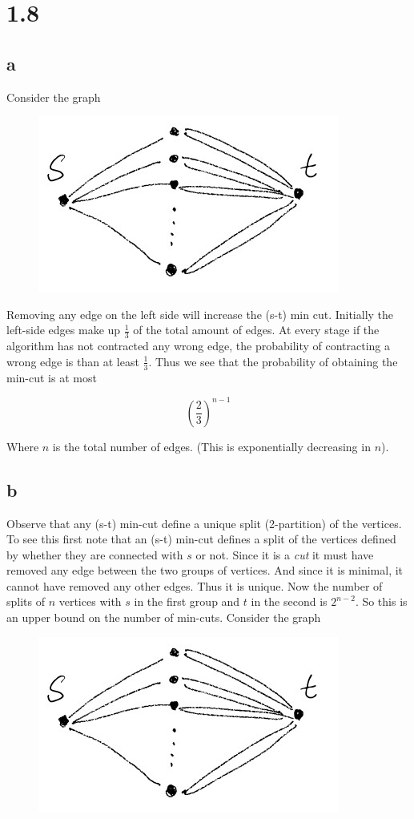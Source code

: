 


\section*{1.8}

\subsection*{a}

Consider the graph

\begin{figure}[h]
	\centering
	\includegraphics[width=0.4\linewidth]{figures/graph1.jpg}
\end{figure}

Removing any edge on the left side will increase the (s-t) min cut. 
Initially the left-side edges make up $\frac{1}{3}$ of the total amount of edges.
At every stage if the algorithm has not contracted any wrong edge, the probability of contracting a wrong edge is than at least $\frac{1}{3}$. Thus we see that the probability of obtaining the min-cut is at most

$$ \left(\frac{2}{3}\right)^{n-1} $$

Where $n$ is the total number of edges. (This is exponentially decreasing in $n$).

\subsection*{b}

Observe that any (s-t) min-cut define a unique split (2-partition) of the vertices.
To see this first note that an (s-t) min-cut defines a split of the vertices defined by whether they are connected with $s$ or not. 
Since it is a \emph{cut} it must have removed any edge between the two groups of vertices.
And since it is minimal, it cannot have removed any other edges. 
Thus it is unique.
Now the number of splits of $n$ vertices with $s$ in the first group and $t$ in the second is $2^{n-2}$.
So this is an upper bound on the number of min-cuts.
Consider the graph

\begin{figure}[h]
	\centering
	\includegraphics[width=0.4\linewidth]{figures/graph1.jpg}
\end{figure}

